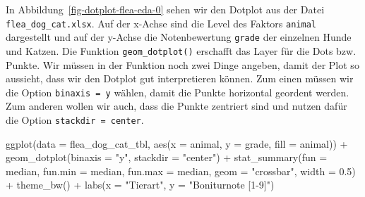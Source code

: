 \documentclass[
  letterpaper,
  DIV=11,
  oneside]{scrreport}
\newenvironment{Shaded}{\begin{snugshade}}{\end{snugshade}}
\newcommand{\AttributeTok}[1]{\textcolor[rgb]{0.40,0.45,0.13}{#1}}
\newcommand{\FloatTok}[1]{\textcolor[rgb]{0.68,0.00,0.00}{#1}}
\newcommand{\FunctionTok}[1]{\textcolor[rgb]{0.28,0.35,0.67}{#1}}
\newcommand{\NormalTok}[1]{\textcolor[rgb]{0.00,0.23,0.31}{#1}}
\newcommand{\SpecialCharTok}[1]{\textcolor[rgb]{0.37,0.37,0.37}{#1}}
\newcommand{\StringTok}[1]{\textcolor[rgb]{0.13,0.47,0.30}{#1}}
\begin{document}
In Abbildung~\ref{fig-dotplot-flea-eda-0} sehen wir den Dotplot aus der
Datei \texttt{flea\_dog\_cat.xlsx}. Auf der x-Achse sind die Level des
Faktors \texttt{animal} dargestellt und auf der y-Achse die
Notenbewertung \texttt{grade} der einzelnen Hunde und Katzen. Die
Funktion \texttt{geom\_dotplot()} erschafft das Layer für die Dots bzw.
Punkte. Wir müssen in der Funktion noch zwei Dinge angeben, damit der
Plot so aussieht, dass wir den Dotplot gut interpretieren können. Zum
einen müssen wir die Option \texttt{binaxis\ =\ y} wählen, damit die
Punkte horizontal geordent werden. Zum anderen wollen wir auch, dass die
Punkte zentriert sind und nutzen dafür die Option
\texttt{stackdir\ =\ center}.

\begin{Shaded}
\begin{Highlighting}[]
\FunctionTok{ggplot}\NormalTok{(}\AttributeTok{data =}\NormalTok{ flea\_dog\_cat\_tbl, }\FunctionTok{aes}\NormalTok{(}\AttributeTok{x =}\NormalTok{ animal, }\AttributeTok{y =}\NormalTok{ grade,}
                            \AttributeTok{fill =}\NormalTok{ animal)) }\SpecialCharTok{+}
  \FunctionTok{geom\_dotplot}\NormalTok{(}\AttributeTok{binaxis =} \StringTok{"y"}\NormalTok{, }\AttributeTok{stackdir =} \StringTok{"center"}\NormalTok{) }\SpecialCharTok{+}
  \FunctionTok{stat\_summary}\NormalTok{(}\AttributeTok{fun =}\NormalTok{ median, }\AttributeTok{fun.min =}\NormalTok{ median, }\AttributeTok{fun.max =}\NormalTok{ median,}
               \AttributeTok{geom =} \StringTok{"crossbar"}\NormalTok{, }\AttributeTok{width =} \FloatTok{0.5}\NormalTok{) }\SpecialCharTok{+}
  \FunctionTok{theme\_bw}\NormalTok{() }\SpecialCharTok{+}
  \FunctionTok{labs}\NormalTok{(}\AttributeTok{x =} \StringTok{"Tierart"}\NormalTok{, }\AttributeTok{y =} \StringTok{"Boniturnote [1{-}9]"}\NormalTok{) }
\end{Highlighting}
\end{Shaded}
\end{document}
